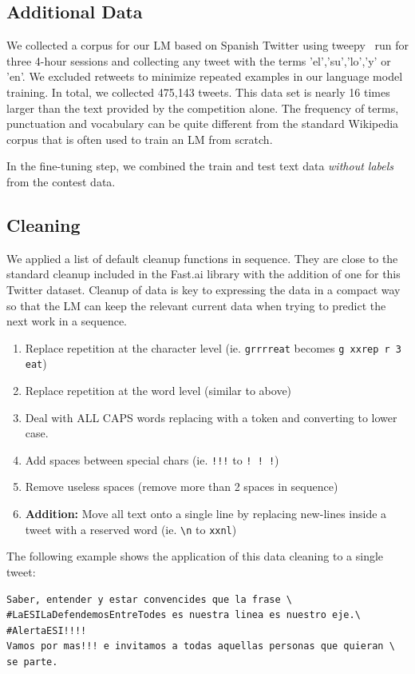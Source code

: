 \documentclass[runningheads]{llncs}
\begin{document}
\subsection{Additional Data}
We collected a corpus for our LM based on Spanish Twitter using tweepy~\cite{Tweepy} run for three 4-hour sessions and collecting any tweet with the terms 'el','su','lo','y' or 'en'. We excluded retweets to minimize repeated examples in our language model training.  In total, we collected 475,143 tweets.  This data set is nearly 16 times larger than the text provided by the competition alone.  The frequency of terms, punctuation and vocabulary can be quite different from the standard Wikipedia corpus that is often used to train an LM from scratch.  

In the fine-tuning step, we combined the train and test text data \textit{without labels} from the contest data.
\subsection{Cleaning}
We applied a list of default cleanup functions in sequence.  They are close to the standard cleanup included in the Fast.ai library with the addition of one for this Twitter dataset. Cleanup of data is key to expressing the data in a compact way so that the LM can keep the relevant current data when trying to predict the next work in a sequence.
\begin{enumerate}
	\item Replace repetition at the character level (ie. \verb|grrrreat| becomes \verb|g xxrep r 3 eat|)
	\item Replace repetition at the word level (similar to above)
	\item Deal with ALL CAPS words replacing with a token and converting to lower case.
	\item Add spaces between special chars (ie. \verb|!!!| to \verb|! ! !|)
	\item Remove useless spaces (remove more than 2 spaces in sequence)	
	\item \textbf{Addition:} Move all text onto a single line by replacing new-lines inside a tweet with a reserved word (ie. \verb|\n| to \verb|xxnl|)
\end{enumerate} 
The following example shows the application of this data cleaning to a single tweet:
\begin{verbatim} 
Saber, entender y estar convencides que la frase \
#LaESILaDefendemosEntreTodes es nuestra linea es nuestro eje.\
#AlertaESI!!!!
Vamos por mas!!! e invitamos a todas aquellas personas que quieran \
se parte.
\end{verbatim}
\end{document}
